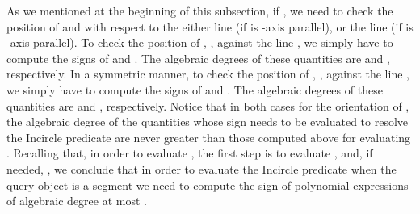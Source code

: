 \documentclass[letterpaper,11pt]{article}
\newcommand{\incircle}{\textsf{Incircle}\xspace}
\newtheorem{lemma}[theorem]{Lemma}
\begin{document}
{\begin{comment}
For the case where  is -parallel we use the fact that
. Using this
linear dependence between  and , we get
,
where  and  are given in Table \ref{table:QSisYpar}.
Given that  is a known root of ,
determining the sign of  is equivalent to determining the
signs of  and  ,  
Replacing  at  and  we get

Let  and  be the algebraic degrees of  and ,
respectively; as in the previous subsection, the algebraic degree of
 is . The algebraic degrees of  and  are
 and , respectively (strictly speaking, the algebraic
degree of  is , which becomes  given that
). Hence, the algebraic degrees of the quantities
 and  become
 and
, respectively. Summarizing:

\begin{lemma}\label{incircle:xxxl}
  Answering the  predicate, when at least
  one of the sites ,  or  is a segment, amounts to
  computing the sign of a polynomial expressions of algebraic degree
  at most .
\end{lemma}


\begin{table}[t]
\begin{center}
\begin{tabular}{|c|c|c|c|}
\hline 
 &  &
\multicolumn{2}{c|}{} \\ 
\hline 
\multirow{2}{*}{}
&  & &  \\ \cline{2-4}
&  & &   \\ \hline
\multirow{2}{*}{}
&   & &  \\ \cline{2-4}
&  & &  \\
\hline 
\end{tabular} 
\end{center}
\caption{Expression for , when  is
  -axis parallel.}\label{table:QSisYpar} 
\end{table}
\end{comment}


As we mentioned at the beginning of this subsection, if
, we need to check the
position of  and  with respect to the either line  (if
 is -axis parallel), or the line  (if  is -axis
parallel). To check the position of , , against the
line , we simply have to compute the signs of  and
. The algebraic degrees of these quantities are 
and , respectively. In a symmetric manner, to check the
position of , , against the line , we
simply have to compute the signs of  and . The
algebraic degrees of these quantities are  and
, respectively. Notice that in both cases for the
orientation of , the algebraic degree of the quantities whose sign
needs to be evaluated to resolve the \incircle predicate are never
greater than those computed above for evaluating
.
Recalling that, in order to evaluate , the
first step is to evaluate , and, if needed,
, we conclude that in order to evaluate the
\incircle predicate when the query object is a segment we need to
compute the sign of polynomial expressions of algebraic degree
at most .



}
\end{document}
